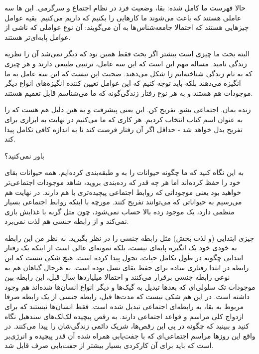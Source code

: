 حالا فهرست ما کامل شده: بقا،‌ وضعیت فرد در نظام اجتماع و سرگرمی. این ها
سه عاملی هستند که باعث می‌شوند ما کارهایی را بکنیم که داریم
می‌کنیم. بقیه عوامل چیزهایی هستند که احتمالا جامعه‌شناس‌ها به آن
 می‌گویند: آن نوع عواملی که ناشی از عوامل پایه‌ای‌تر
هستند.

البته بحث ما چیزی است بیشتر  اگر بحث فقط همین بود که دیگر نمی‌شد آن را نظریه زندگی
نامید. مساله مهم این است که این سه عامل، ترتیبی طبیعی دارند و هر چیزی
که به نام زندگی شناخته‌ایم را شکل می‌دهند. صحبت این نیست که این سه عامل
به ما انگیزه می‌دهند بلکه باید توجه کنیم که این عوامل تعیین کننده
انگیزه‌های انواع دیگر موجودات هم هستند و به هر نوع رفتار زندگی‌گونه که
ما می‌شناسم قابل تعمیم هستند.

زنده بمان. اجتماعی بشو. تفریح کن. این یعنی پیشرفت و به هین دلیل هم هست
که  را به عنوان اسم کتاب انتخاب کردیم. هر کاری
که ما می‌کنیم در نهایت به ابزاری برای تفریح بدل خواهد شد - حداقل اگر آن
رفتار فرصت کند تا به اندازه کافی تکامل پیدا کند.

باور نمی‌کنید؟

به این نگاه کنید که ما چگونه حیوانات را به  و
 طبقه‌بندی کرده‌ایم. همه حیوانات بقای خود را حفظ
کرده‌اند اما هر چه قدر که رده‌بندی  بروید، شاهد موجودات
اجتماعی‌تر خواهید بود یعنی موجوداتی که روابط اجتماعی پیچیده‌تری با هم
دارند. در نهایت هم می‌رسیم به حیواناتی که می‌توانند تفریح کنند. مورچه با
اینکه روابط اجتماعی بسیار منظمی دارد، یک موجود رده بالا حساب نمی‌شود،
چون مثل گربه با غذایش بازی نمی‌کند و از رابطه جنسی هم لذت نمی‌برد.

چیزی ابتدایی (و لذت بخش) مثل رابطه جنسی را در نظر بگیرید. به نظر من
این رابطه به خودی خود یک انگیزه پایه‌ای نیست، بلکه نمونه‌ای عالی است از
اینکه یک رفتار ابتدایی چگونه در طول تکامل حیات، تحول پیدا کرده
است. هیچ شکی نیست که این رابطه در ابتدا رفتاری ساده برای حفظ بقای نسل
بوده است. به هرحال گیاهان هم به نوعی رابطه جنسی برقرار می‌کنند و احتمالا
میلیاردها سال قبل، این رابطه بین موجودات تک سلولی‌ای که بعدها تبدیل به
گیک‌ها و دیگر انواع انسان‌ها شده‌اند هم وجود داشته است. در این هم شکی
نیست که مدت‌ها قبل، رابطه جنسی از یک رابطه صرفا مربوط به بقا، به
رابطه‌ای اجتماعی تبدیل شده است. فقط انسان‌ها نیستند که برای ازدواج کلی
مراسم و قواعد اجتماعی دارند. به رقص پیچیده لک‌لک‌های
سندهیل نگاه کنید و ببینید که چگونه در پی این
رقص‌ها، شریک دائمی زندگی‌شان را پیدا می‌کنند. در واقع این روزها مراسم
اجتماعی‌ای که با جفت‌یابی همراه شده آن قدر پیچیده و انرژی‌بر است که باید
برای آن کارکردی بسیار بیشتر از جفت‌یابی صرف قایل شد.

